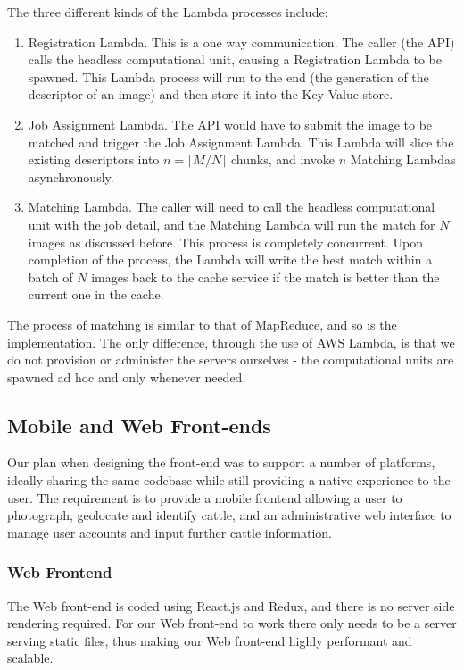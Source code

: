 The three different kinds of the Lambda processes include:

\begin{enumerate}
	\item Registration Lambda. This is a one way communication. The caller (the API) calls the headless computational unit, causing a Registration Lambda to be spawned. This Lambda process will run to the end (the generation of the descriptor of an image) and then store it into the Key Value store.
	\item Job Assignment Lambda. The API would have to submit the image to be matched and trigger the Job Assignment Lambda. This Lambda will slice the existing descriptors into $n=\lceil M / N \rceil$ chunks, and invoke $n$ Matching Lambdas asynchronously.
	\item Matching Lambda. The caller will need to call the headless computational unit with the job detail, and the Matching Lambda will run the match for $N$ images as discussed before. This process is completely concurrent. Upon completion of the process, the Lambda will write the best match within a batch of $N$ images back to the cache service if the match is better than the current one in the cache.
\end{enumerate}

The process of matching is similar to that of MapReduce, and so is the implementation. The only difference, through the use of AWS Lambda, is that we do not provision or administer the servers ourselves - the computational units are spawned ad hoc and only whenever needed.

\subsection{Mobile and Web Front-ends}

Our plan when designing the front-end was to support a number of platforms, ideally sharing the same codebase while still providing a native experience to the user. The requirement is to provide a mobile frontend allowing a user to photograph, geolocate and identify cattle, and an administrative web interface to manage user accounts and input further cattle information. 

\subsubsection{Web Frontend}
The Web front-end is coded using React.js and Redux, and there is no server side rendering required. For our Web front-end to work there only needs to be a server serving static files, thus making our Web front-end highly performant and scalable.

